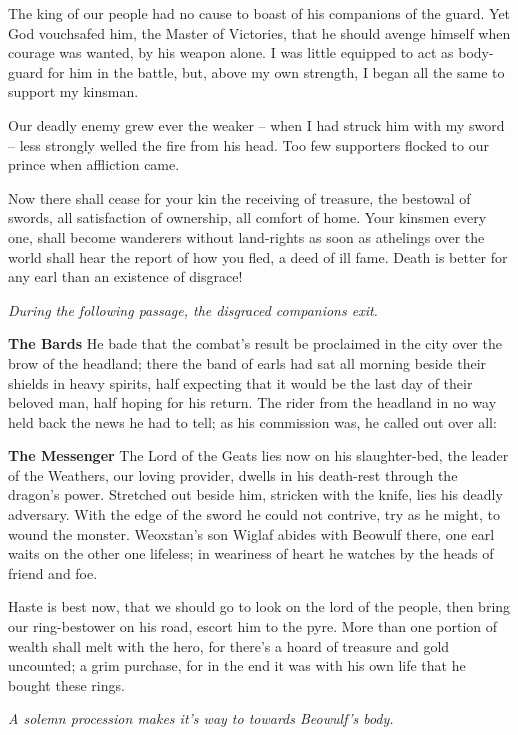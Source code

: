 \documentclass[a4paper]{article}
\begin{document}
{The king of our people had no cause to boast
of his companions of the guard. Yet God vouchsafed him,
the Master of Victories, that he should avenge himself
when courage was wanted, by his weapon alone.
I was little equipped to act as body-guard
for him in the battle, but, above my own strength,
I began all the same to support my kinsman.

Our deadly enemy grew ever the weaker –
when I had struck him with my sword – less strongly welled
the fire from his head. Too few supporters
flocked to our prince when affliction came.

Now there shall cease for your kin the receiving of treasure,
the bestowal of swords, all satisfaction of ownership,
all comfort of home. Your kinsmen every one,
shall become wanderers without land-rights
as soon as athelings over the world
shall hear the report of how you fled,
a deed of ill fame. Death is better
for any earl than an existence of disgrace!

\centerline{\textit{During the following passage, the disgraced companions exit.}}

\textbf{The Bards} He bade that the combat's result be proclaimed in the city
over the brow of the headland; there the band of earls
had sat all morning beside their shields
in heavy spirits, half expecting
that it would be the last day of their beloved man,
half hoping for his return. The rider from the headland
in no way held back the news he had to tell;
as his commission was, he called out over all:

\newpage
\textbf{The Messenger} The Lord of the Geats lies now on his slaughter-bed,
the leader of the Weathers, our loving provider,
dwells in his death-rest through the dragon's power.
Stretched out beside him, stricken with the knife,
lies his deadly adversary. With the edge of the sword
he could not contrive, try as he might,
to wound the monster. Weoxstan's son
Wiglaf abides with Beowulf there,
one earl waits on the other one lifeless;
in weariness of heart he watches by the heads
of friend and foe.

Haste is best now,
that we should go to look on the lord of the people,
then bring our ring-bestower on his road,
escort him to the pyre. More than one portion of wealth
shall melt with the hero, for there's a hoard of treasure
and gold uncounted; a grim purchase,
for in the end it was with his own life
that he bought these rings.

\centerline{\textit{A solemn procession makes it's way to towards Beowulf's body.}}

}
\end{document}
